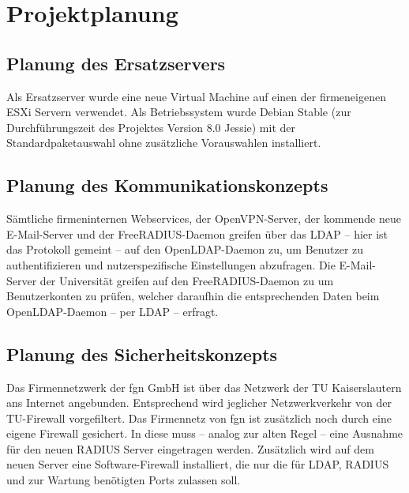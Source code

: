\documentclass[11pt,a4paper,titlepage=firstiscover,headsepline,bibtotoc]{scrartcl} %
\newcommand{\hilight}[1]{\colorbox{yellow}{#1}} %
\begin{document}
\section{Projektplanung}
\subsection{Planung des Ersatzservers}
Als Ersatzserver wurde eine neue Virtual Machine auf einen der firmeneigenen ESXi Servern verwendet. Als Betriebssystem wurde Debian Stable (zur Durchführungszeit des Projektes Version 8.0 Jessie) mit der Standardpaketauswahl ohne zusätzliche Vorauswahlen installiert.

\subsection{Planung des Kommunikationskonzepts}
Sämtliche firmeninternen Webservices, der OpenVPN-Server, der kommende neue E-Mail-Server und der FreeRADIUS-Daemon greifen über das LDAP -- hier ist das Protokoll gemeint -- auf den OpenLDAP-Daemon zu, um Benutzer zu authentifizieren und nutzerspezifische Einstellungen abzufragen. Die E-Mail-Server der Universität greifen auf den FreeRADIUS-Daemon zu um Benutzerkonten zu prüfen, welcher daraufhin die entsprechenden Daten beim OpenLDAP-Daemon -- per LDAP -- erfragt.


\subsection{Planung des Sicherheitskonzepts}\label{sec:Sicherheitskonzept}
Das Firmennetzwerk der fgn GmbH ist über das Netzwerk der TU Kaiserslautern ans Internet angebunden. Entsprechend wird jeglicher Netzwerkverkehr von der TU-Firewall vorgefiltert. Das Firmennetz von fgn ist zusätzlich noch durch eine eigene Firewall gesichert. In diese muss -- analog zur alten Regel -- eine Ausnahme für den neuen RADIUS Server eingetragen werden. Zusätzlich wird auf dem neuen Server eine Software-Firewall installiert, die nur die für LDAP, RADIUS und zur Wartung benötigten Ports zulassen soll.

\end{document}
